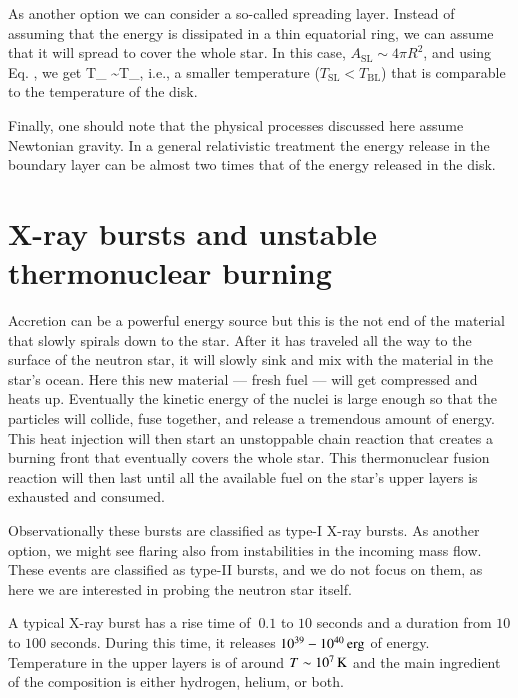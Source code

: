 As another option we can consider a so-called spreading layer.\cite{IS99, SP06}
Instead of assuming that the energy is dissipated in a thin equatorial ring, we can assume that it will spread to cover the whole star.
In this case, $A_{\mathrm{SL}} \sim 4\pi R^2$, and using Eq. , we get 
\be
T_{} \sim T_{},
\ee
i.e., a smaller temperature ($T_{\mathrm{SL}} < T_{\mathrm{BL}}$) that is comparable to the temperature of the disk.

Finally, one should note that the physical processes discussed here assume Newtonian gravity.
In a general relativistic treatment the energy release in the boundary layer can be almost two times that of the energy released in the disk.\cite{SS86, SS00}



\section{X-ray bursts and unstable thermonuclear burning}

Accretion can be a powerful energy source but this is the not end of the material that slowly spirals down to the star.
After it has traveled all the way to the surface of the neutron star, it will slowly sink and mix with the material in the star's ocean.
Here this new material --- fresh fuel --- will get compressed and heats up.
Eventually the kinetic energy of the nuclei is large enough so that the particles will collide, fuse together, and release a tremendous amount of energy.
This heat injection will then start an unstoppable chain reaction that creates a burning front that eventually covers the whole star.
This thermonuclear fusion reaction will then last until all the available fuel on the star's upper layers is exhausted and consumed.

Observationally these bursts are classified as type-I X-ray bursts.\cite[see][for a review]{Lewin93, SB10}
As another option, we might see flaring also from instabilities in the incoming mass flow. 
These events are classified as type-II bursts, and we do not focus on them, as here we are interested in probing the neutron star itself.


A typical X-ray burst has a rise time of $~0.1$ to $10$ seconds and a duration from $10$ to $100$ seconds.
During this time, it releases $10^{39} - 10^{40} \, \mathrm{erg}$ of energy.
Temperature in the upper layers is of around $T \sim 10^7 \, \mathrm{K}$ and the main ingredient of the composition is either hydrogen, helium, or both.

